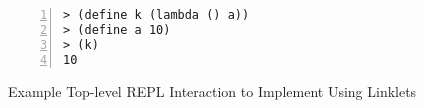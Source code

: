 \begin{figure}[!htbp]
\centering
\begin{minipage}{0.4\textwidth}
\begin{lstlisting}[language=racket,
                basicstyle=\ttfamily\footnotesize,
                numbers=left, xleftmargin=2em]
> (define k (lambda () a))
> (define a 10)
> (k)
10
\end{lstlisting}
\end{minipage}
\caption{Example Top-level REPL Interaction to Implement Using Linklets}
\label{fig:toplevel-example-repl-interactions}
\end{figure}
